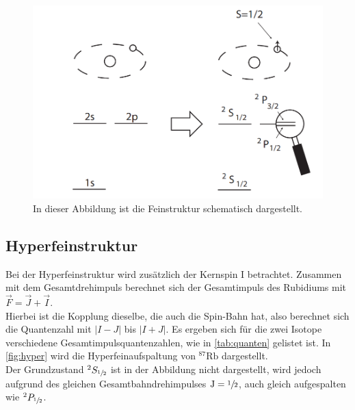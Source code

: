 \begin{figure}[H]
    \centering
    \includegraphics[scale=0.4]{figures/feinstruktur.png}
    \caption{In dieser Abbildung ist die Feinstruktur schematisch dargestellt.\cite{pdf_anleitung}}
    \label{fig:fein}
\end{figure}

\subsection{Hyperfeinstruktur}
Bei der Hyperfeinstruktur wird zusätzlich der Kernspin I betrachtet.
Zusammen mit dem Gesamtdrehimpuls berechnet sich der Gesamtimpuls des Rubidiums mit $\vec{F} = \vec{J} + \vec{I}$.\\
Hierbei ist die Kopplung dieselbe, die auch die Spin-Bahn hat, also berechnet sich die Quantenzahl mit $|I-J|$ bis $|I+J|$.
Es ergeben sich für die zwei Isotope verschiedene Gesamtimpulsquantenzahlen, wie in \autoref{tab:quanten} gelistet ist.
In \autoref{fig:hyper} wird die Hyperfeinaufspaltung von $^{87}\text{Rb}$ dargestellt.\\
Der Grundzustand $^2S_{\sfrac{1}{2}}$ ist in der Abbildung nicht dargestellt, wird jedoch aufgrund des gleichen Gesamtbahndrehimpulses $\text{J}=\sfrac{1}{2}$, auch gleich aufgespalten wie $^2P_{\sfrac{1}{2}}$.

